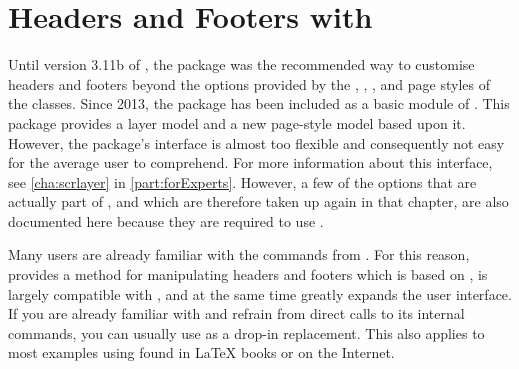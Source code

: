 \chapter[{Headers and Footers with \Package{scrlayer-scrpage}}]
  {Headers and
  Footers with }
%
\BeginIndexGroup
{}%
\begin{Explain}
  Until version 3.11b of \KOMAScript, the %
   package was
  the recommended way to customise headers and footers beyond the options
  provided by the , ,
  , and  page styles of the \KOMAScript{}
  classes.
  \iffalse%
  The still older \Package{scrpage}\IndexPackage{scrpage} package was marked
  obsolete in 2001 and removed from the regular \KOMAScript{} distribution in
  2013.\par
  \fi%
  Since 2013, the \hyperref[cha:scrlayer]{}%
   package has been included as a basic module of
  \KOMAScript. This package provides a layer model and a new page-style model
  based upon it. However, the package's interface is almost too flexible and
  consequently not easy for the average user to comprehend. For more
  information about this interface, see \autoref{cha:scrlayer} in
  \autoref{part:forExperts}. However, a few of the options that are actually
  part of , and which are therefore taken up again in that
  chapter, are also documented here because they are required to use
  .

  Many users are already familiar with the commands from .
  For this reason,  provides a method for
  manipulating headers and footers which is based on , is
  largely compatible with , and at the same time greatly
  expands the user interface. If you are already familiar with
   and refrain from direct calls to its internal commands,
  you can usually use  as a drop-in replacement.
  This also applies to most examples using  found in
  \LaTeX{} books or on the Internet.%
  \iffalse%
    \iffree{}{\par With the release of this book, \Package{scrlayer-scrpage}
      for \KOMAScript{} is recommended as the tool of choice when it comes to
      changing the predefined page styles. Using the obsolete package
      \Package{scrpage2}\IndexPackage[indexmain]{scrpage2}%
      \important{\Package{scrpage2}} is now deprecated. Therefore, the
      commands for this outdated package are no longer part of this book. If
      you encounter older documents that still use \Package{scrpage2},
      consider switching to \Package{scrlayer-scrpage}. Notwithstanding, this
      chapter does contain some hints for using \Package{scrpage2}.}%
  \fi
\end{Explain}

